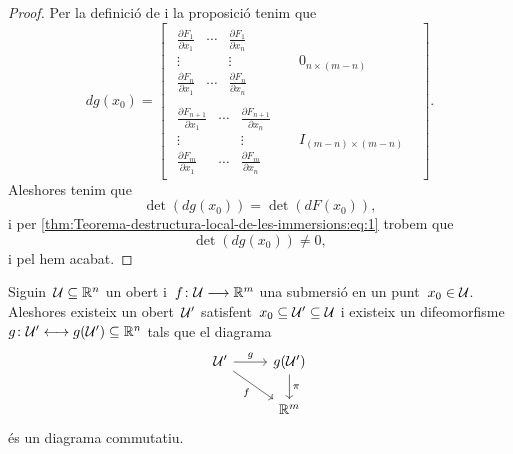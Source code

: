 \documentclass[../geometria-diferencial.tex]{subfiles}
\begin{document}
\begin{proof}
        Per la definició de  i la proposició  tenim que
        \[dg(x_{0})=\left[\begin{array}{c|ccc}
            \begin{matrix}
                \frac{\partial F_{1}}{\partial x_{1}} & \cdots & \frac{\partial F_{1}}{\partial x_{n}} \\
                \vdots & & \vdots \\
                \frac{\partial F_{n}}{\partial x_{1}} & \cdots & \frac{\partial F_{n}}{\partial x_{n}}
            \end{matrix} & & 0_{n\times(m-n)} & \\ \hline
            \begin{matrix}
                \frac{\partial F_{n+1}}{\partial x_{1}} & \cdots & \frac{\partial F_{n+1}}{\partial x_{n}} \\
                \vdots & & \vdots \\
                \frac{\partial F_{m}}{\partial x_{1}} & \cdots & \frac{\partial F_{m}}{\partial x_{n}}
            \end{matrix} & & I_{(m-n)\times(m-n)} &
        \end{array}\right].\]
        Aleshores tenim que
        \[
            \det(dg(x_{0}))=\det(dF(x_{0})),
        \]
        i per \eqref{thm:Teorema-destructura-local-de-les-immersions:eq:1} trobem que
        \[
            \det(dg(x_{0}))\neq0,
        \]
        i pel  hem acabat.
    \end{proof}
    \begin{theorem}
        \label{thm:Teorema-destructura-local-de-les-submersions}
        Siguin~\(\mathcal{U}\subseteq\mathbb{R}^{n}\) un obert i~\(f\colon\mathcal{U}\longrightarrow\mathbb{R}^{m}\) una submersió en un punt~\(x_{0}\in\mathcal{U}\).
        Aleshores existeix un obert~\(\mathcal{U}'\) satisfent~\(x_{0}\subseteq\mathcal{U}'\subseteq\mathcal{U}\) i existeix un difeomorfisme~\(g\colon\mathcal{U}'\longleftrightarrow g(\mathcal{U}')\subseteq\mathbb{R}^{n}\) tals que el diagrama
        \[\begin{tikzcd}
            \obert{U}' \arrow{r}{g} \arrow[swap]{dr}{f} & g(\obert{U}') \arrow{d}{\pi} \\
            & \mathbb{R}^{m}
        \end{tikzcd}\]
        és un diagrama commutatiu.
    \end{theorem}
\end{document}
